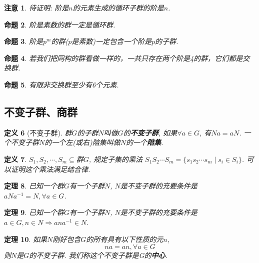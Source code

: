 \documentclass[UTF8]{ctexart}
\newtheorem{Definition}{定义}%
\newtheorem{Theorem}[Definition]{定理}
\newtheorem{Remark}[Definition]{注意}
\newtheorem{Proposition}[Definition]{命题}
\begin{document}
\begin{Remark}
待证明: 阶是$n$的元素生成的循环子群的阶是$n$.
\end{Remark}

\begin{Proposition}
阶是素数的群一定是循环群.
\end{Proposition}

\begin{Proposition}
阶是$p^m$的群($p$是素数)一定包含一个阶是$p$的子群.
\end{Proposition}

\begin{Proposition}
若我们把同构的群看做一样的，一共只存在两个阶是4的群，它们都是交换群.
\end{Proposition}

\begin{Proposition}
有限非交换群至少有6个元素.
\end{Proposition}

\subsection{不变子群、商群}

\begin{Definition}[不变子群]
群$G$的子群$N$叫做$G$的\textbf{不变子群}, 如果$\forall a \in G$, 有$Na = aN$. 一个不变子群$N$的一个左(或右)陪集叫做$N$的一个\textbf{陪集}.
\end{Definition}

\begin{Definition}
$S_1, S_2, \cdots, S_m \subseteq $群$G$, 规定子集的乘法
$S_1 S_2 \cdots S_m = \{s_1 s_2 \cdots s_m \mid s_i \in S_i \}$. 可以证明这个乘法满足结合律.
\end{Definition}

\begin{Theorem}
已知一个群$G$有一个子群$N$, $N$是不变子群的充要条件是$aNa^{-1} = N, \forall a \in G$.
\end{Theorem}

\begin{Theorem}
已知一个群$G$有一个子群$N$, $N$是不变子群的充要条件是
$a \in G, n \in N \Rightarrow ana^{-1} \in N $.
\end{Theorem}

\begin{Theorem}
如果$N$刚好包含$G$的所有具有以下性质的元$n$,
$$
	na = an, \forall a \in G
$$
则$N$是$G$的不变子群. 我们称这个不变子群是G的\textbf{中心}.
\end{Theorem}
\end{document}
